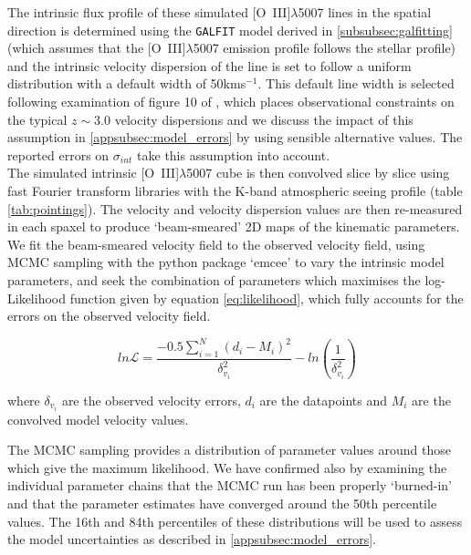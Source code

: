 \documentclass[fleqn,usenatbib]{mn2e}
\newcommand{\Lagr}{\mathcal{L}}
\begin{document}
The intrinsic flux profile of these simulated [O~{\sc III}]$\lambda$5007 lines in the spatial direction is determined using the {\tt GALFIT} model derived in \cref{subsubsec:galfitting} (which assumes that the [O~{\sc III}]$\lambda$5007 emission profile follows the stellar profile) and the intrinsic velocity dispersion of the line is set to follow a uniform distribution with a default width of 50kms$^{-1}$.
This default line width is selected following examination of figure 10 of \cite{Wisnioski2015}, which places observational constraints on the typical $z\sim3.0$ velocity dispersions and we discuss the impact of this assumption in \cref{appsubsec:model_errors} by using sensible alternative values.
The reported errors on $\sigma_{int}$ take this assumption into account. \\

The simulated intrinsic [O~{\sc III}]$\lambda$5007 cube is then convolved slice by slice using fast Fourier transform libraries with the K-band atmospheric seeing profile (table \ref{tab:pointings}).
The velocity and velocity dispersion values are then re-measured in each spaxel to produce `beam-smeared' 2D maps of the kinematic parameters.
We fit the beam-smeared velocity field to the observed velocity field, using MCMC sampling with the python package `emcee' \citep{Foreman-Mackey2013} to vary the intrinsic model parameters, and seek the combination of parameters which maximises the log-Likelihood function given by equation \ref{eq:likelihood}, which fully accounts for the errors on the observed velocity field.

\begin{equation}\label{eq:likelihood}
   ln\Lagr = \frac{-0.5\sum_{i=1}^{N}(d_{i} - M_{i})^{2}}{\delta_{v_{i}}^{2}} - ln\left(\frac{1}{\delta_{v_{i}}^{2}}\right)
\end{equation}

\noindent
where $\delta_{v_{i}}$ are the observed velocity errors, $d_{i}$ are the datapoints and $M_{i}$ are the convolved model velocity values.

The MCMC sampling provides a distribution of parameter values around those which give the maximum likelihood.
We have confirmed also by examining the individual parameter chains that the MCMC run has been properly `burned-in' and that the parameter estimates have converged around the 50th percentile values.
The 16th and 84th percentiles of these distributions will be used to assess the model uncertainties as described in \cref{appsubsec:model_errors}.
\end{document}
